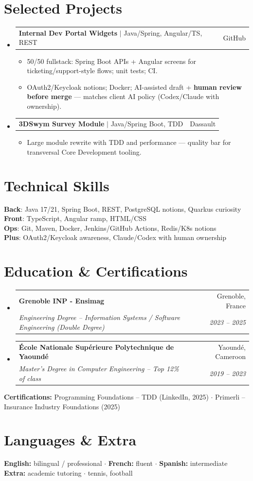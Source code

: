 \documentclass[letterpaper,10.5pt]{article}
\makeatletter
\newcommand{\resumeItem}[1]{\item\small{#1 \vspace{-1.5pt}}}
\newcommand{\resumeSubheading}[4]{
  \vspace{-1pt}\item
    \begin{tabular*}{0.97\textwidth}[t]{l@{\extracolsep{\fill}}r}
      \textbf{#1} & #2 \\
      \textit{\small#3} & \textit{\small #4} \\
    \end{tabular*}\vspace{-5pt}
}
\newcommand{\resumeProjectHeading}[2]{
    \item
    \begin{tabular*}{0.97\textwidth}{l@{\extracolsep{\fill}}r}
      \small#1 & #2 \\
    \end{tabular*}\vspace{-5pt}
}
\newcommand{\resumeSubHeadingListStart}{\begin{itemize}[leftmargin=0.15in, label={}]}
\newcommand{\resumeSubHeadingListEnd}{\end{itemize}}
\newcommand{\resumeItemListStart}{\begin{itemize}[leftmargin=0.18in]}
\newcommand{\resumeItemListEnd}{\end{itemize}\vspace{-3pt}}
\makeatother
\begin{document}
\section{Selected Projects}

\resumeSubHeadingListStart
  \resumeProjectHeading
    {\textbf{Internal Dev Portal Widgets} $|$ Java/Spring, Angular/TS, REST}{GitHub}
    \resumeItemListStart
      \resumeItem{50/50 fullstack: Spring Boot APIs + Angular screens for ticketing/support-style flows; unit tests; CI.}
      \resumeItem{OAuth2/Keycloak notions; Docker; AI-assisted draft + \textbf{human review before merge} --- matches client AI policy (Codex/Claude with ownership).}
    \resumeItemListEnd
  \resumeProjectHeading
    {\textbf{3DSwym Survey Module} $|$ Java/Spring Boot, TDD}{Dassault}
    \resumeItemListStart
      \resumeItem{Large module rewrite with TDD and performance --- quality bar for transversal Core Development tooling.}
    \resumeItemListEnd
\resumeSubHeadingListEnd

\section{Technical Skills}

\begin{itemize}[leftmargin=0.15in, label={}]
  \small{\item{
\textbf{Back}: Java 17/21, Spring Boot, REST, PostgreSQL notions, Quarkus curiosity \\
\textbf{Front}: TypeScript, Angular ramp, HTML/CSS \\
\textbf{Ops}: Git, Maven, Docker, Jenkins/GitHub Actions, Redis/K8s notions \\
\textbf{Plus}: OAuth2/Keycloak awareness, Claude/Codex with human ownership
  }}
\end{itemize}

\section{Education \& Certifications}

\resumeSubHeadingListStart
  \resumeSubheading
    {Grenoble INP - Ensimag}{Grenoble, France}
    {Engineering Degree -- Information Systems / Software Engineering (Double Degree)}{2023 -- 2025}
  \resumeSubheading
    {\'Ecole Nationale Sup\'erieure Polytechnique de Yaound\'e}{Yaound\'e, Cameroon}
    {Master's Degree in Computer Engineering -- Top 12\% of class}{2019 -- 2023}
\resumeSubHeadingListEnd
\small{
\textbf{Certifications:} Programming Foundations -- TDD (LinkedIn, 2025) $\cdot$ Primerli -- Insurance Industry Foundations (2025)
}

\section{Languages \& Extra}
\small{
\textbf{English:} bilingual / professional $\cdot$ \textbf{French:} fluent $\cdot$ \textbf{Spanish:} intermediate \\
\textbf{Extra:} academic tutoring $\cdot$ tennis, football
}
\end{document}
